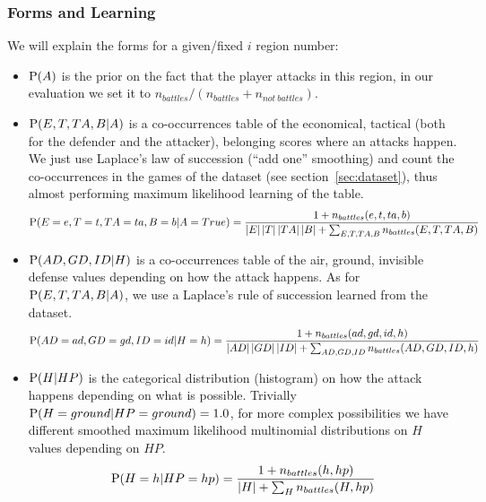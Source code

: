 \subsubsection{Forms and Learning}
\label{sec:tacticalidentification}
We will explain the forms for a given/fixed $i$ region number:
\begin{itemize}
\item $\mathrm{P}(A)$ is the prior on the fact that the player attacks in this region, in our evaluation we set it to $n_{battles}/(n_{battles}+n_{not\ battles})$. 
\item $\mathrm{P}(E,T,TA,B|A)$ is a co-occurrences table of the economical, tactical (both for the defender and the attacker), belonging scores where an attacks happen. We just use Laplace's law of succession (``add one'' smoothing) \cite{Jaynes} and count the co-occurrences in the games of the dataset (see section~\ref{sec:dataset}), thus almost performing maximum likelihood learning of the table. 
$$\mathrm{P}(E=e,T=t,TA=ta,B=b|A=True) = \frac{1+n_{battles}(e,t,ta,b)}{\left\lvert E\right\rvert \left\lvert T\right\rvert \left\lvert TA\right\rvert \left\lvert B\right\rvert + \sum_{E,T,TA,B} n_{battles}(E,T,TA,B)}$$


\item $\mathrm{P}(AD,GD,ID|H)$ is a co-occurrences table of the air, ground, invisible defense values depending on how the attack happens. As for $\mathrm{P}(E,T,TA,B|A)$, we use a Laplace's rule of succession learned from the dataset.
$$\mathrm{P}(AD=ad,GD=gd,ID=id|H=h) = \frac{1+n_{battles}(ad,gd,id,h)}{\left\lvert AD\right\rvert \left\lvert GD\right\rvert \left\lvert ID\right\rvert + \sum_{AD,GD,ID} n_{battles}(AD,GD,ID,h)}$$

\item $\mathrm{P}(H|HP)$ is the categorical distribution (histogram) on how the attack happens depending on what is possible. Trivially $\mathrm{P}(H=ground|HP=ground)=1.0$, for more complex possibilities we have different smoothed maximum likelihood multinomial distributions on $H$ values depending on $HP$.
$$\mathrm{P}(H=h|HP=hp) = \frac{1 + n_{battles}(h,hp)}{\left\lvert H\right\rvert + \sum_{H} n_{battles}(H,hp)}$$


\end{itemize}
